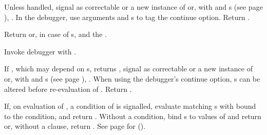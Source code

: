 \begin{LIST}{1cm}
  {
    Unless handled, signal as correctable  
    or a new instance of  or, with 
     and s (see page \pageref{section:Format}),
    . In the debugger, use  arguments
     and s to tag the continue
    option. Return \retval{\NIL}.
  }

  {
  Return  or, in case of s,
  \retval{\NIL} and the .
  }

  {
  Invoke debugger with .
  }

  {
    If , which may depend on s, returns \NIL,
    signal as correctable   or a new
    instance of  or, with 
     and s (see page \pageref{section:Format}),
    . When using the debugger's continue option,
    s can be altered before re-evaluation of
    . Return \retval{\NIL}.
  }

  {
    If, on evaluation of , a condition of  is
    signalled, evaluate matching s with 
    bound to the condition, and return . Without
    a condition, bind s to values of  and
    return  or, without a
     clause, return . See
    page \pageref{section:Functions} for ().
  }


\end{LIST}
